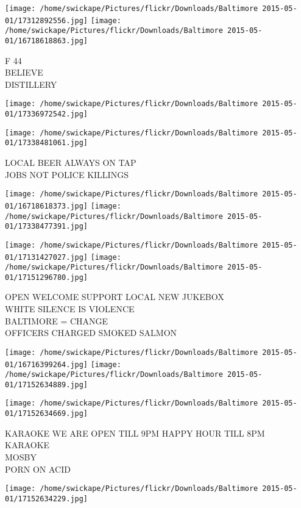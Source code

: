 \documentclass[10pt,letterpaper]{article}
\begin{document}
\vspace{0.25in}
\texttt{[image: /home/swickape/Pictures/flickr/Downloads/Baltimore 2015-05-01/17312892556.jpg]}
\texttt{[image: /home/swickape/Pictures/flickr/Downloads/Baltimore 2015-05-01/16718618863.jpg]}

F 44\\
BELIEVE\\
DISTILLERY
\pagebreak

\texttt{[image: /home/swickape/Pictures/flickr/Downloads/Baltimore 2015-05-01/17336972542.jpg]}

\vspace{0.25in}
\texttt{[image: /home/swickape/Pictures/flickr/Downloads/Baltimore 2015-05-01/17338481061.jpg]}

LOCAL BEER ALWAYS ON TAP\\
JOBS NOT POLICE KILLINGS
\pagebreak

\texttt{[image: /home/swickape/Pictures/flickr/Downloads/Baltimore 2015-05-01/16718618373.jpg]}
\texttt{[image: /home/swickape/Pictures/flickr/Downloads/Baltimore 2015-05-01/17338477391.jpg]}

\texttt{[image: /home/swickape/Pictures/flickr/Downloads/Baltimore 2015-05-01/17131427027.jpg]}
\texttt{[image: /home/swickape/Pictures/flickr/Downloads/Baltimore 2015-05-01/17151296780.jpg]}

OPEN WELCOME SUPPORT LOCAL NEW JUKEBOX\\
WHITE SILENCE IS VIOLENCE\\
BALTIMORE = CHANGE\\
OFFICERS CHARGED SMOKED SALMON
\pagebreak

\texttt{[image: /home/swickape/Pictures/flickr/Downloads/Baltimore 2015-05-01/16716399264.jpg]}
\texttt{[image: /home/swickape/Pictures/flickr/Downloads/Baltimore 2015-05-01/17152634889.jpg]}

\texttt{[image: /home/swickape/Pictures/flickr/Downloads/Baltimore 2015-05-01/17152634669.jpg]}

KARAOKE WE ARE OPEN TILL 9PM HAPPY HOUR TILL 8PM KARAOKE\\
MOSBY\\
PORN ON ACID
\pagebreak

\texttt{[image: /home/swickape/Pictures/flickr/Downloads/Baltimore 2015-05-01/17152634229.jpg]}
\end{document}
